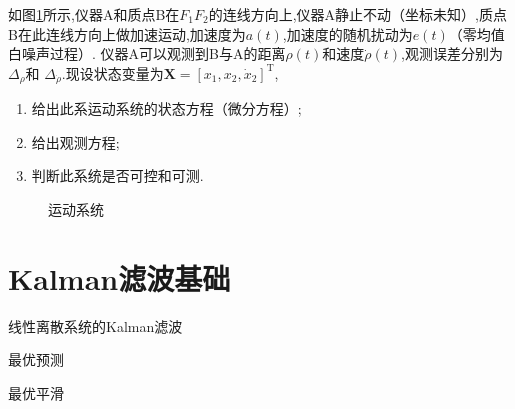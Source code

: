 \documentclass[cn,10pt,citestyle=gb7714-2015,bibstyle=gb7714-2015]{elegantbook}
\newcommand{\mT}{\mathrm{T}}
\begin{document}
\begin{problemset}
  \item 如图\ref{fig:exercise-LDS}所示,仪器A和质点B在$F_1F_2$的连线方向上,仪器A静止不动（坐标未知）,质点
  B在此连线方向上做加速运动,加速度为$a(t)$,加速度的随机扰动为$e(t)$（零均值白噪声过程）.
  仪器A可以观测到B与A的距离$\rho(t)$和速度$\dot{\rho}(t)$,观测误差分别为$\varDelta_\rho$和
  $\varDelta_{\dot{\rho}}$.现设状态变量为$\bm{X}=[x_1,x_2,\dot{x}_2]^\mT$,
  \begin{enumerate}
    \item 给出此系运动系统的状态方程（微分方程）;
    \item 给出观测方程;
    \item 判断此系统是否可控和可测.
  \end{enumerate}
  \begin{figure}[H]
    \centering
    \caption{运动系统}
    \label{fig:exercise-LDS}
  \end{figure}
\end{problemset}
\chapter{\textup{Kalman}滤波基础}\label{ch:kalman-filter}
\begin{introduction}
  \item 线性离散系统的\textup{Kalman}滤波
  \item 最优预测
  \item 最优平滑
\end{introduction}
\end{document}
